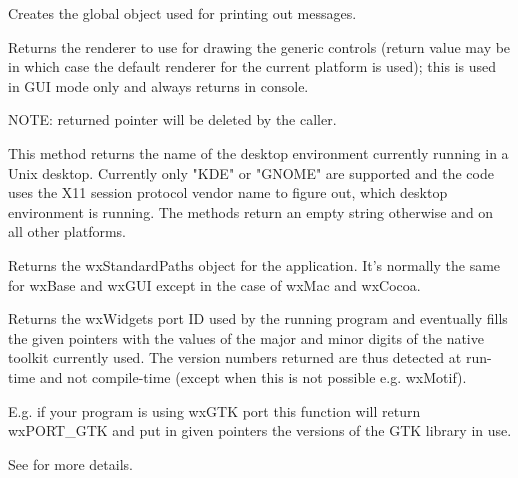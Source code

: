 
Creates the global object used for printing out messages.


\label{wxapptraitscreaterenderer}


Returns the renderer to use for drawing the generic controls (return value may be \NULL
in which case the default renderer for the current platform is used);
this is used in GUI mode only and always returns \NULL in console.

NOTE: returned pointer will be deleted by the caller.

\label{wxapptraitsgetdesktopenvironment}


This method returns the name of the desktop environment currently
running in a Unix desktop. Currently only "KDE" or "GNOME" are
supported and the code uses the X11 session protocol vendor name
to figure out, which desktop environment is running. The methods
return an empty string otherwise and on all other platforms.

\label{wxapptraitsgetstandardpaths}


Returns the wxStandardPaths object for the application.
It's normally the same for wxBase and wxGUI except in the case of wxMac and wxCocoa.

\label{wxapptraitsgettoolkitversion}


Returns the wxWidgets port ID used by the running program and eventually
fills the given pointers with the values of the major and minor digits
of the native toolkit currently used.
The version numbers returned are thus detected at run-time and not compile-time
(except when this is not possible e.g. wxMotif).

E.g. if your program is using wxGTK port this function will return wxPORT\_GTK and
put in given pointers the versions of the GTK library in use.

See  for more details.


